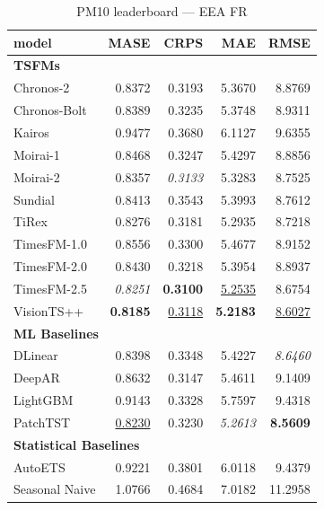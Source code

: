 \begin{table}[H]
\caption{PM10 leaderboard --- EEA FR}
\centering
\begin{small}
\begin{tabular}{lrrrr}
\toprule
model & MASE & CRPS & MAE & RMSE \\
\midrule
\multicolumn{5}{l}{\textbf{TSFMs}} \\
Chronos-2 & 0.8372 & 0.3193 & 5.3670 & 8.8769 \\
Chronos-Bolt & 0.8389 & 0.3235 & 5.3748 & 8.9311 \\
Kairos & 0.9477 & 0.3680 & 6.1127 & 9.6355 \\
Moirai-1 & 0.8468 & 0.3247 & 5.4297 & 8.8856 \\
Moirai-2 & 0.8357 & \textit{0.3133} & 5.3283 & 8.7525 \\
Sundial & 0.8413 & 0.3543 & 5.3993 & 8.7612 \\
TiRex & 0.8276 & 0.3181 & 5.2935 & 8.7218 \\
TimesFM-1.0 & 0.8556 & 0.3300 & 5.4677 & 8.9152 \\
TimesFM-2.0 & 0.8430 & 0.3218 & 5.3954 & 8.8937 \\
TimesFM-2.5 & \textit{0.8251} & \textbf{0.3100} & \underline{5.2535} & 8.6754 \\
VisionTS++ & \textbf{0.8185} & \underline{0.3118} & \textbf{5.2183} & \underline{8.6027} \\
\midrule
\multicolumn{5}{l}{\textbf{ML Baselines}} \\
DLinear & 0.8398 & 0.3348 & 5.4227 & \textit{8.6460} \\
DeepAR & 0.8632 & 0.3147 & 5.4611 & 9.1409 \\
LightGBM & 0.9143 & 0.3328 & 5.7597 & 9.4318 \\
PatchTST & \underline{0.8230} & 0.3230 & \textit{5.2613} & \textbf{8.5609} \\
\midrule
\multicolumn{5}{l}{\textbf{Statistical Baselines}} \\
AutoETS & 0.9221 & 0.3801 & 6.0118 & 9.4379 \\
Seasonal Naive & 1.0766 & 0.4684 & 7.0182 & 11.2958 \\
\bottomrule
\end{tabular}
\end{small}
\end{table}
